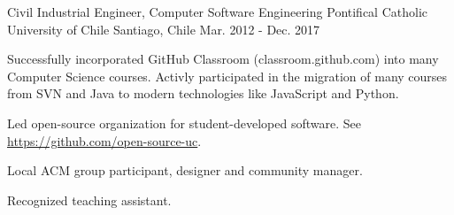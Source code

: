 

\begin{cventries}

  \cventry
    {Civil Industrial Engineer, Computer Software Engineering}
    {Pontifical Catholic University of Chile}
    {Santiago, Chile}
    {Mar. 2012 - Dec. 2017}
    {
      \begin{cvitems}
        \item Successfully incorporated GitHub Classroom (classroom.github.com) into many Computer Science courses. Activly participated in the migration of many courses from SVN and Java to modern technologies like JavaScript and Python.
        \item Led open-source organization for student-developed software. See \url{https://github.com/open-source-uc}.
        \item {Local ACM group participant, designer and community manager.}
        \item {Recognized teaching assistant.}
      \end{cvitems}
    }

\end{cventries}
